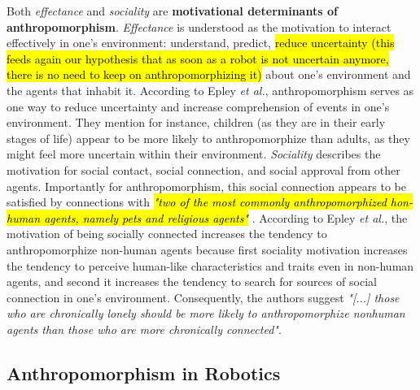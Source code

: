 \documentclass[lettersize, apacite, twoside, HRI]{apa_HRI}
\begin{document}
	Both \textit{effectance} and \textit{sociality} are \textbf{motivational determinants of anthropomorphism}. \textit{Effectance} is understood as the motivation to interact effectively in one's environment: understand, predict, \hl{reduce uncertainty (this feeds again our hypothesis that as soon as a robot is not uncertain anymore, there is no need to keep on anthropomorphizing it)} about one's environment and the agents that inhabit it. According to Epley \textit{et al.}, anthropomorphism serves as one way to reduce uncertainty and increase comprehension of events in one's environment. They mention for instance, children (as they are in their early stages of life) appear to be more likely to anthropomorphize than adults, as they might feel more uncertain within their environment.
	\textit{Sociality} describes the motivation for social contact, social connection, and social approval from other agents. Importantly for anthropomorphism, this social connection appears to be satisfied by connections with \hl{ \textit{"two of the most commonly anthropomorphized hon-human agents, namely pets and religious agents"}} \cite{epley_seeing_2007}. According to Epley \textit{et al.}, the motivation of being socially connected increases the tendency to anthropomorphize non-human agents because first sociality motivation increases the tendency to perceive human-like characteristics and traits even in non-human agents, and second it increases the tendency to search for sources of social connection in one's environment. Consequently, the authors suggest \textit{"[...] those who are chronically lonely should be more likely to anthropomorphize nonhuman agents than those who are more chronically connected"}. 
	

\subsection{Anthropomorphism in Robotics}
\label{sec:anthropomorphism-robotics}
	
\end{document}
